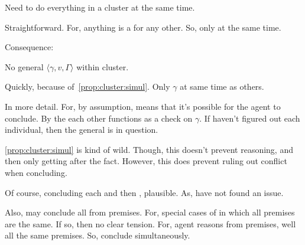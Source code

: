 \begin{note}
  
\end{note}


\begin{note}
  \begin{proposition}
    \label{prop:cluster:simul}
    Need to do everything in a cluster at the same time.
  \end{proposition}

  \begin{argument}
    Straightforward.
    For, anything is a \requ{} for any other.
    So, only \csV{} at the same time.
  \end{argument}
\end{note}

\begin{note}[No \(\gamma\)]
  Consequence:

  \begin{corollary}
    \label{prop:cluster:no-general}
    No general \(\langle \gamma,v,\Gamma \rangle\) within cluster.
  \end{corollary}

  \begin{argument}
    Quickly, because of~\ref{prop:cluster:simul}.
    Only \(\gamma\) at same time as others.

    In more detail.
    For, by assumption, \requ{} means that it's possible for the agent to conclude.
    By the each other \requ{} functions as a check on \(\gamma\).
    If haven't figured out each individual, then the general is in question.
  \end{argument}
\end{note}

\begin{note}
  \autoref{prop:cluster:simul} is kind of wild.
  Though, this doesn't prevent reasoning, and then only getting \csN{} after the fact.
  However, this does prevent ruling out conflict when concluding.

  Of course, concluding each and then \csVImp{}, plausible.
  As, have not found an issue.

  Also, may conclude all from premises.
  For, special cases of \cluster{} in which all premises are the same.
  If so, then no clear tension.
  For, agent reasons from premises, well all the same premises.
  So, conclude simultaneously.
\end{note}

